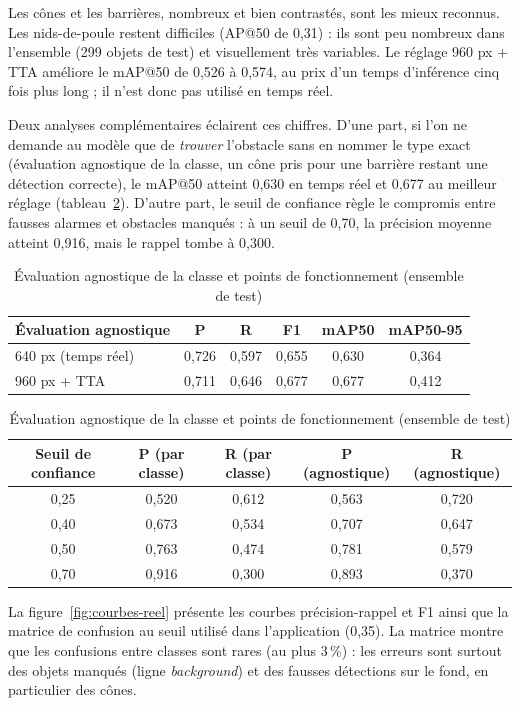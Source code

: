Les cônes et les barrières, nombreux et bien contrastés, sont les mieux reconnus. Les nids-de-poule restent
difficiles (AP@50 de 0,31) : ils sont peu nombreux dans l'ensemble (299 objets de test) et visuellement très
variables. Le réglage 960 px + TTA améliore le mAP@50 de 0,526 à 0,574, au prix d'un temps d'inférence cinq fois
plus long ; il n'est donc pas utilisé en temps réel.

Deux analyses complémentaires éclairent ces chiffres. D'une part, si l'on ne demande au modèle que de \emph{trouver}
l'obstacle sans en nommer le type exact (évaluation agnostique de la classe, un cône pris pour une barrière restant
une détection correcte), le mAP@50 atteint 0,630 en temps réel et 0,677 au meilleur réglage
(tableau~\ref{tab:agnostique}). D'autre part, le seuil de confiance règle le compromis entre fausses alarmes et
obstacles manqués : à un seuil de 0,70, la précision moyenne atteint 0,916, mais le rappel tombe à 0,300.

\begin{table}[H]
\centering\small
\caption{Évaluation agnostique de la classe et points de fonctionnement (ensemble de test)}
\label{tab:agnostique}
\begin{tabular}{lccccc}
\toprule
\textbf{Évaluation agnostique} & P & R & F1 & mAP50 & mAP50-95 \\
\midrule
640 px (temps réel) & 0,726 & 0,597 & 0,655 & 0,630 & 0,364 \\
960 px + TTA & 0,711 & 0,646 & 0,677 & 0,677 & 0,412 \\
\bottomrule
\end{tabular}

\vspace{0.3cm}
\begin{tabular}{ccccc}
\toprule
\textbf{Seuil de confiance} & \textbf{P (par classe)} & \textbf{R (par classe)} & \textbf{P (agnostique)} &
\textbf{R (agnostique)} \\
\midrule
0,25 & 0,520 & 0,612 & 0,563 & 0,720 \\
0,40 & 0,673 & 0,534 & 0,707 & 0,647 \\
0,50 & 0,763 & 0,474 & 0,781 & 0,579 \\
0,70 & 0,916 & 0,300 & 0,893 & 0,370 \\
\bottomrule
\end{tabular}
\end{table}

La figure~\ref{fig:courbes-reel} présente les courbes précision-rappel et F1 ainsi que la matrice de confusion au
seuil utilisé dans l'application (0,35). La matrice montre que les confusions entre classes sont rares (au plus
3\,\%) : les erreurs sont surtout des objets manqués (ligne \emph{background}) et des fausses détections sur le
fond, en particulier des cônes.

